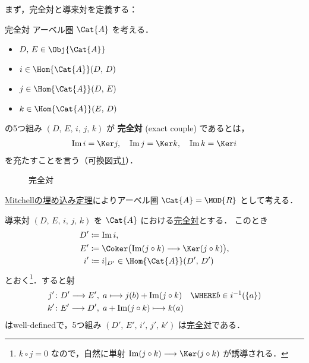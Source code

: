 \documentclass[algtopo_main]{subfiles}
\begin{document}
まず，完全対と導来対を定義する：

\begin{mydef}[label=def:exact-couple]{完全対}
    アーベル圏 $\Cat{A}$ を考える． 
    \begin{itemize}
        \item $D,\, E \in \Obj{\Cat{A}}$
        \item $i \in \Hom{\Cat{A}}(D,\, D)$
        \item $j \in \Hom{\Cat{A}}(D,\, E)$
        \item $k \in \Hom{\Cat{A}}(E,\, D)$
    \end{itemize}
    の5つ組み $(D,\, E,\, i,\, j,\, k)$ が \textbf{完全対} (exact couple) であるとは，
    \begin{align}
        \Im i = \Ker j,\quad \Im j = \Ker k,\quad \Im k = \Ker i
    \end{align}
    を充たすことを言う（可換図式\ref{cmtd:exact-couple}）．
\end{mydef}

\begin{figure}[H]
    \centering
    \caption{完全対}
    \label{cmtd:exact-couple}
\end{figure}%

\hyperref[thm:embedding]{Mitchellの埋め込み定理}によりアーベル圏 $\Cat{A} = \MOD{R}$ として考える．

\begin{myprop}[label=prop:derived-couple]{導来対}
    $(D,\, E,\, i,\, j,\, k)$ を $\Cat{A}$ における\hyperref[def:exact-couple]{完全対}とする．
    このとき
    \begin{align}
        D' &\coloneqq \Im i, \\
        E' &\coloneqq \Coker \bigl( \Im (j \circ k) \lto \Ker (j \circ k) \bigr) , \\
        i' &\coloneqq i|_{D'} \in \Hom{\Cat{A}}(D',\, D')
    \end{align}
    とおく\footnote{$k \circ j = 0$ なので，自然に単射 $\Im (j \circ k) \lto \Ker (j \circ k)$ が誘導される．}．すると射
    \begin{align}
        j' &\colon D' \lto E',\;  a \lmto j(b) + \Im (j \circ k) \quad \WHERE b \in i^{-1}(\{a\}) \\
        k' &\colon E' \lto D',\;  a + \Im (j \circ k) \lmto k(a)
    \end{align}
    はwell-definedで，5つ組み $(D',\, E',\, i',\, j',\, k')$ は\hyperref[def:exact-couple]{完全対}である．
\end{myprop}
\end{document}
